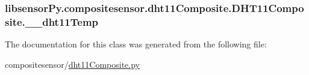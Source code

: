 \subsubsection[{\+\_\+\+\_\+dht11\+Temp}]{\setlength{\rightskip}{0pt plus 5cm}libsensor\+Py.\+compositesensor.\+dht11\+Composite.\+D\+H\+T11\+Composite.\+\_\+\+\_\+dht11\+Temp\hspace{0.3cm}{\ttfamily [private]}}\label{classlibsensorPy_1_1compositesensor_1_1dht11Composite_1_1DHT11Composite_a89c269b67afd0e32d1f762f3104ee914}


The documentation for this class was generated from the following file\+:\begin{DoxyCompactItemize}
\item 
compositesensor/\hyperlink{compositesensor_2dht11Composite_8py}{dht11\+Composite.\+py}\end{DoxyCompactItemize}
